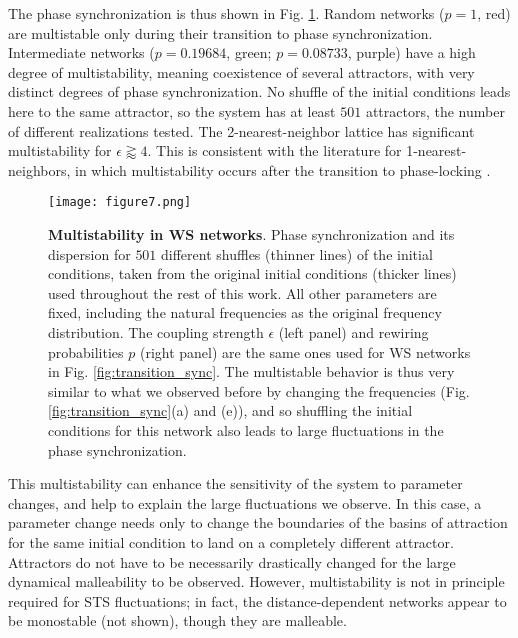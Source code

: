 The phase synchronization is thus shown in Fig. \ref{fig:multistability}. Random networks ($p = 1$, red) are multistable only during their transition to phase synchronization. Intermediate networks ($p = 0.19684$, green; $p = 0.08733$, purple) have a high degree of multistability, meaning coexistence of several attractors, with very distinct degrees of phase synchronization. No shuffle of the initial conditions leads here to the same attractor, so the system has at least $501$ attractors, the number of different realizations tested.
The 2-nearest-neighbor lattice has significant multistability for $\epsilon \gtrapprox 4$. This is consistent with the literature for 1-nearest-neighbors, in which multistability occurs after the transition to phase-locking \cite{tilles2011multistable}. 
%
\begin{figure}[htb!]
    \centering
    \texttt{[image: figure7.png]}
    \caption{\textbf{Multistability in WS networks}. Phase synchronization and its dispersion for $501$ different shuffles (thinner lines) of the initial conditions, taken from the original initial conditions (thicker lines) used throughout the rest of this work. All other parameters are fixed, including the natural frequencies as the original frequency distribution. The coupling strength $\epsilon$ (left panel) and rewiring probabilities $p$ (right panel) are the same ones used for WS networks in Fig. \ref{fig:transition_sync}. The multistable behavior is thus very similar to what we observed before by changing the frequencies (Fig. \ref{fig:transition_sync}(a) and (e)), and so shuffling the initial conditions for this network also leads to large fluctuations in the phase synchronization. }
    \label{fig:multistability}
\end{figure}

This multistability can enhance the sensitivity of the system to parameter changes, and help to explain the large fluctuations we observe. In this case, a parameter change needs only to change the boundaries of the basins of attraction for the same initial condition to land on a completely different attractor. Attractors do not have to be necessarily drastically changed for the large dynamical malleability to be observed.
However, multistability is not in principle required for STS fluctuations; in fact, the distance-dependent networks appear to be monostable (not shown), though they are malleable. %

